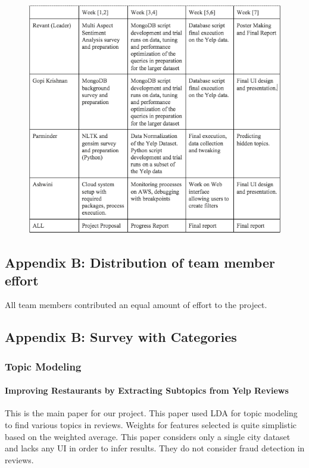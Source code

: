 \documentclass[12pt]{article} %
\begin{document}
\begin{figure}[h]
\begin{center}
\includegraphics[width=6in]{act.png}
\end{center}
\end{figure}

\subsection{Appendix B: Distribution of team member effort}

All team members contributed an equal amount of effort to the project.

\subsection{Appendix B: Survey with Categories}

\subsubsection{Topic Modeling}

\paragraph{Improving Restaurants by Extracting Subtopics from Yelp Reviews}
This is the main paper for our project. This paper used LDA for topic modeling to find various topics in reviews. Weights for features selected is quite simplistic based on the weighted average. This paper considers only a single city dataset and lacks any UI in order to infer results. They do not consider fraud detection in reviews.
\end{document}
